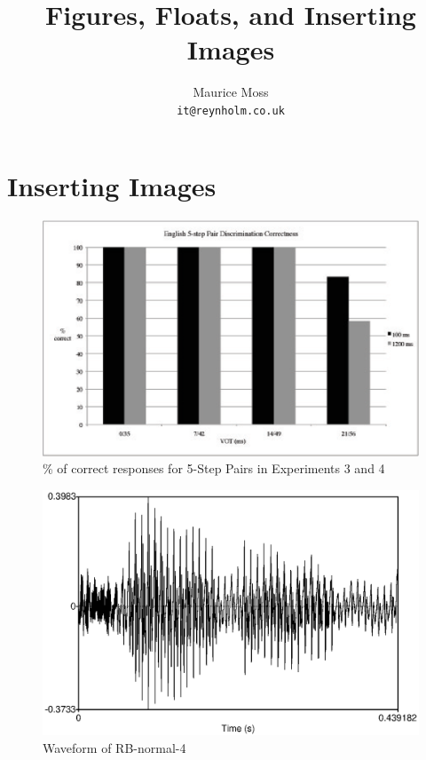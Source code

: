 \documentclass[12pt, letterpaper]{article}
\title{Figures, Floats, and Inserting Images}
\author{Maurice Moss\\{\tt it@reynholm.co.uk}}
\begin{document}
	
	\maketitle


	\section{Inserting Images}

	\begin{figure}[htp]
		\centering
		\includegraphics{english5stepcorrect}
		\caption{\% of correct responses for 5-Step Pairs in Experiments 3 and 4}
		\label{fig:english5stepcorrect}
	\end{figure}

	\begin{figure}[p]
		\centering
		\includegraphics{waveform}
		\caption{Waveform of RB-normal-4}
		\label{fig:waveform}
	\end{figure}
\end{document}
